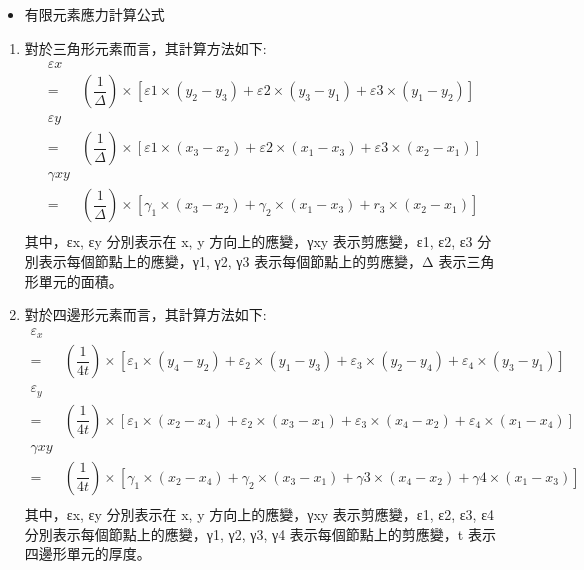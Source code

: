 \begin{itemize}
\item 有限元素應力計算公式
\end{itemize}
\begin{enumerate}
\item 對於三角形元素而言，其計算方法如下:\\
\[
\begin{aligned}
\varepsilon x\\
=&\left( \dfrac{1}{\Delta }\right) \times \left[ \varepsilon 1\times \left( y_{2}-y_{3}\right) +\varepsilon 2\times \left( y_{3}-y_{1}\right) +\varepsilon 3\times \left( y_{1}-y_{2}\right) \right]\\
\varepsilon y\\
=&\left( \dfrac{1}{\Delta }\right) \times \left[ \varepsilon 1\times \left( x_{3}-x_{2}\right) +\varepsilon 2\times \left( x_{1}-x_{3}\right) +\varepsilon 3\times \left( x_{2}-x_{1}\right) \right]\\
\gamma xy\\
=&\left( \dfrac{1}{\Delta }\right) \times \left[ \gamma _{1}\times \left( x_{3}-x_{2}\right) +\gamma _{2}\times \left( x_{1}-x_{3}\right) +r_{3}\times \left( x_{2}-x_{1}\right) \right]\\
\end{aligned}
\]
其中，εx, εy 分別表示在 x, y 方向上的應變，γxy 表示剪應變，ε1, ε2, ε3 分別表示每個節點上的應變，γ1, γ2, γ3 表示每個節點上的剪應變，Δ 表示三角形單元的面積。\\

\item 對於四邊形元素而言，其計算方法如下:\\
\[
\begin{aligned}
\varepsilon _{x}\\
=&\left( \dfrac{1}{4t}\right) \times \left[ \varepsilon _{1}\times \left( y_{4}-y_{2}\right) +\varepsilon _{2}\times \left( y_{1}-y_{3}\right) +\varepsilon _{3}\times \left( y_{2}-y_{4}\right) +\varepsilon _{4}\times \left( y_{3}-y_{1}\right) \right]\\
\varepsilon _{y}\\
=&\left( \dfrac{1}{4t}\right) \times \left[ \varepsilon _{1}\times \left( x_{2}-x_{4}\right) +\varepsilon _{2}\times \left( x_{3}-x_{1}\right) +\varepsilon _{3}\times \left( x_{4}-x_{2}\right) +\varepsilon _{4}\times \left( x_{1}-x_{4}\right) \right]\\
\gamma xy\\
=&\left( \dfrac{1}{4t}\right) \times \left[ \gamma _{1}\times \left( x_{2}-x_{4}\right) +\gamma _{2}\times \left( x_{3}-x_{1}\right) +\gamma 3\times \left( x_{4}-x_{2}\right) +\gamma 4\times \left( x_{1}-x_{3}\right) \right]\\
\end{aligned}
\]
其中，εx, εy 分別表示在 x, y 方向上的應變，γxy 表示剪應變，ε1, ε2, ε3, ε4 分別表示每個節點上的應變，γ1, γ2, γ3, γ4 表示每個節點上的剪應變，t 表示四邊形單元的厚度。
\end{enumerate}
\newpage

